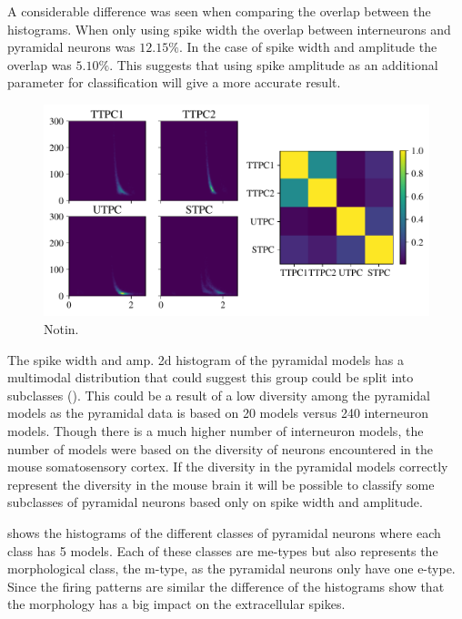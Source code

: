 \documentclass[altfont, fleqn]{uiophd}
\renewcommand{\cref}[1]{{\color{viridis_03}\mycref{#1}}}
\renewcommand{\Cref}[1]{{\color{viridis_03}\myCref{#1}}}
\begin{document}
A considerable difference was seen when comparing the overlap
between the histograms. 
When only using spike width the overlap between interneurons
and pyramidal neurons was $12.15\%$.
In the case of spike width and amplitude the overlap
was $5.10\%$.
This suggests that using spike amplitude as an additional 
parameter for classification will give a more accurate result. 
\begin{figure}[h]
    \begin{center}
        \includegraphics[width=\linewidth]{images/sec_4/pyr_overlap.pdf}
        \caption{Notin.}
        \label{fig:4_pyr_overlap}
    \end{center}
\end{figure}
The spike width and amp. 2d histogram of the pyramidal models
has a multimodal distribution that could suggest this group could
be split into subclasses (\cref{fig:4_int_pyr_hist}).
This could be a result of
a low diversity among the pyramidal models as 
the pyramidal data is based on 20 models versus 240
interneuron models. 
Though there is a much higher number of interneuron models,
the number of models were based on the diversity of neurons encountered
in the mouse somatosensory cortex. 
If the diversity in the pyramidal models correctly represent the
diversity in the mouse brain it will be possible to classify some
subclasses of pyramidal neurons based only on spike width and
amplitude.

\Cref{fig:4_pyr_overlap} shows the histograms of the 
different classes of pyramidal neurons 
where each class has 5 models.
Each of these classes are me-types but also represents the
morphological class, the m-type, as the pyramidal neurons only have one 
e-type. 
Since the firing patterns are similar
the difference of the histograms
show that the morphology has a big impact on the extracellular spikes. 
\end{document}
